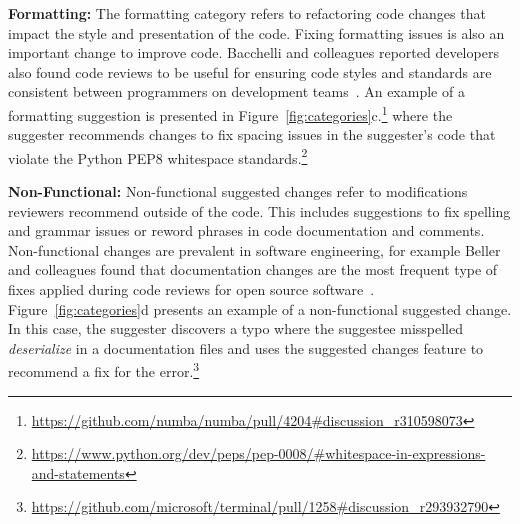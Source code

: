 \textbf{Formatting:} The formatting category refers to refactoring code changes that impact the style and presentation of the code. Fixing formatting issues is also an important change to improve code. Bacchelli and colleagues reported developers also found code reviews to be useful for ensuring code styles and standards are consistent between programmers on development teams~\cite{bacchelli2013codereview}. An example of a formatting suggestion is presented in Figure~\ref{fig:categories}c.\footnote{\url{https://github.com/numba/numba/pull/4204#discussion_r310598073}} where the suggester recommends changes to fix spacing issues in the suggester's code that violate the Python PEP8 whitespace standards.\footnote{\url{https://www.python.org/dev/peps/pep-0008/#whitespace-in-expressions-and-statements}}

\textbf{Non-Functional:} Non-functional suggested changes refer to modifications reviewers recommend outside of the code. This includes suggestions to fix spelling and grammar issues or reword phrases in code documentation and comments. Non-functional changes are prevalent in software engineering, for example Beller and colleagues found that documentation changes are the most frequent type of fixes applied during code reviews for open source software~\cite{beller2014modern}. Figure~\ref{fig:categories}d presents an example of a non-functional suggested change. In this case, the suggester discovers a typo where the suggestee misspelled \textit{deserialize} in a documentation files and uses the suggested changes feature to recommend a fix for the error.\footnote{\url{https://github.com/microsoft/terminal/pull/1258#discussion_r293932790}}


